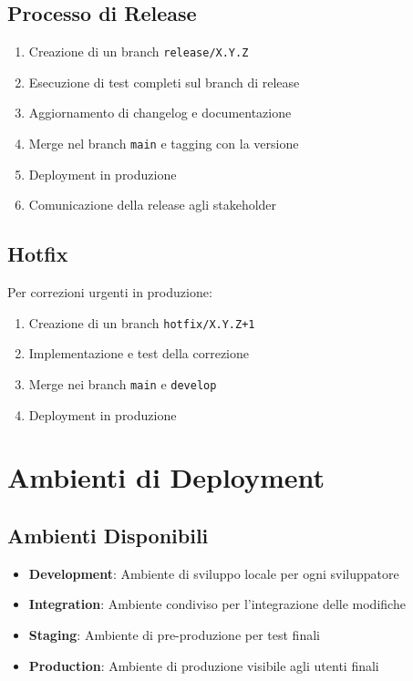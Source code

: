 \subsection{Processo di Release}
\begin{enumerate}
    \item Creazione di un branch \texttt{release/X.Y.Z}
    \item Esecuzione di test completi sul branch di release
    \item Aggiornamento di changelog e documentazione
    \item Merge nel branch \texttt{main} e tagging con la versione
    \item Deployment in produzione
    \item Comunicazione della release agli stakeholder
\end{enumerate}

\subsection{Hotfix}
Per correzioni urgenti in produzione:
\begin{enumerate}
    \item Creazione di un branch \texttt{hotfix/X.Y.Z+1}
    \item Implementazione e test della correzione
    \item Merge nei branch \texttt{main} e \texttt{develop}
    \item Deployment in produzione
\end{enumerate}

\section{Ambienti di Deployment}

\subsection{Ambienti Disponibili}
\begin{itemize}
    \item \textbf{Development}: Ambiente di sviluppo locale per ogni sviluppatore
    \item \textbf{Integration}: Ambiente condiviso per l'integrazione delle modifiche
    \item \textbf{Staging}: Ambiente di pre-produzione per test finali
    \item \textbf{Production}: Ambiente di produzione visibile agli utenti finali
\end{itemize}

